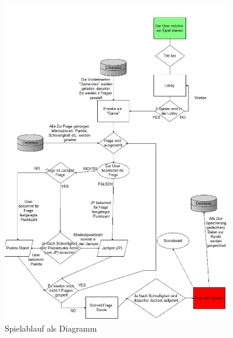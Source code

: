 \documentclass[11pt,a4paper]{scrreprt}
\begin{document}
\begin{figure}
	\centering
	\includegraphics[width=0.9\textwidth, height=0.9\textheight]{Diagramm_002.jpg}
	\caption{Spielablauf als Diagramm}
	\label{img:Spielablauf}
\end{figure}
\end{document}
